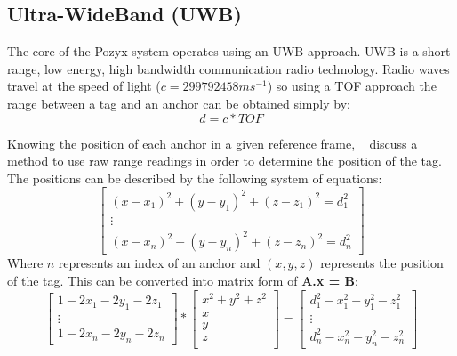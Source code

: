 \subsection{Ultra-WideBand (UWB)}
The core of the Pozyx system operates using an UWB approach.
UWB is a short range, low energy, high bandwidth communication radio technology.
Radio waves travel at the speed of light ($c=299792458ms^{-1}$) so using a TOF approach the range between a tag and an anchor can be obtained simply by:
\[
    d = c*TOF
\]

Knowing the position of each anchor in a given reference frame, ~\citet{evaluwb} discuss a method to use raw range readings in order to determine the position of the tag.
The positions can be described by the following system of equations:
        \begin{equation}
                \left[
            \begin{array}{c}
                (x - x_1)^2 + (y - y_1)^2 + (z - z_1)^2 = d_1^2\\
                \vdots\\
                (x - x_n)^2 + (y - y_n)^2 + (z - z_n)^2 = d_n^2
            \end{array}
                \right]
        \end{equation}
        Where $n$ represents an index of an anchor and $(x,y,z)$ represents the position of the tag.
        This can be converted into matrix form of \textbf{A.x = B}:
        \begin{equation}
            \left[
            \begin{array}{c}
                1 - 2x_1 -2y_1 -2z_1\\
                \vdots\\
                1 - 2x_n -2y_n -2z_n
            \end{array}
            \right]
        *
            \left[
                \begin{array}{c}
                    x^2 + y^2 +z^2\\
                    x\\
                    y\\
                    z\\
                \end{array}
            \right]
            =
        \left[
            \begin{array}{c}
                d_1^2 - x_1^2 - y_1^2 -z_1^2\\
                \vdots\\
                d_n^2 - x_n^2 - y_n^2 -z_n^2
            \end{array}
        \right]
       \end{equation}

